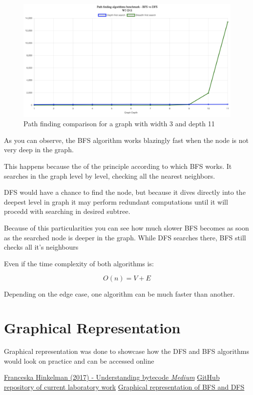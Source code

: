 \documentclass[12pt]{article}
\begin{document}
\begin{figure}[h]
    \centering
    \includegraphics[width=1\textwidth]{images/w3d11.png}
    \caption{Path finding comparison for a graph with width 3 and depth 11}
    \label{fig:w3d11}
\end{figure}

\clearpage

As you can observe, the BFS algorithm works blazingly fast when the node is not very deep in the graph.

This happens because the of the principle according to which BFS works. 
It searches in the graph level by level, checking all the nearest neighbors.

DFS would have a chance to find the node, but because it dives directly into the deepest level
in graph it may perform redundant computations until it will procedd with searching in desired subtree.

Because of this particularities you can see how much slower BFS becomes as soon as the searched node 
is deeper in the graph. While DFS searches there, BFS still checks all it's neighbours

Even if the time complexity of both algorithms is:

$$O(n) = V + E$$

Depending on the edge case, one algorithm can be much faster than another.

\section*{Graphical Representation}
\hspace{0.8cm}
Graphical representation was done to showcase how the DFS and BFS algorithms would look on practice
and can be accessed online\cite{site}

\begin{thebibliography}{9}

   \href{https://medium.com/dailyjs/understanding-v8s-bytecode-317d46c94775}{Franceska
      Hinkelman (2017) - Understanding bytecode \emph{Medium}}
   \href{https://github.com/DdimaPos/AA-labs/tree/main/Lab2}{GitHub repository of current laboratory work}
   \href{https://sorting-algorithms-visualizer-rho.vercel.app/}{Graphical representation of BFS and DFS}
\end{thebibliography}
\end{document}
